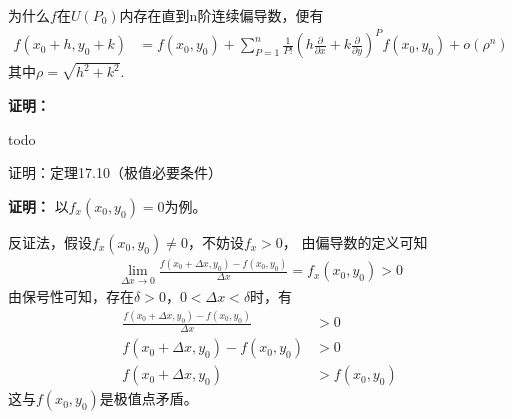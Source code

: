 \documentclass{article}
\begin{document}
\begin{zremark}
  为什么$f$在$U(P_0)$内存在直到n阶连续偏导数，便有
  \begin{align*}
    f(x_0 + h, y_0 + k)
     & = f(x_0, y_0) + \sum\limits_{P = 1}^n \frac{1}{P!}(h \frac{\partial}{\partial x} + k \frac{\partial}{\partial y})^P f(x_0, y_0) + o(\rho^n)
  \end{align*}
  其中$\rho = \sqrt{h^2 + k^2}$.
\end{zremark}
\textbf{证明：}

todo

\begin{zremark}
  证明：定理17.10（极值必要条件）
\end{zremark}
\textbf{证明：}
以$f_x(x_0, y_0) = 0$为例。

反证法，假设$f_x(x_0, y_0) \neq 0$，不妨设$f_x > 0$，
由偏导数的定义可知
\begin{align*}
  \lim\limits_{\Delta x \to 0} \frac{f(x_0 + \Delta x, y_0) - f(x_0, y_0)}{\Delta x}
  = f_x(x_0, y_0) > 0
\end{align*}
由保号性可知，存在$\delta > 0$，$0 < \Delta x < \delta$时，有
\begin{align*}
  \frac{f(x_0 + \Delta x, y_0) - f(x_0, y_0)}{\Delta x} & > 0           \\
  f(x_0 + \Delta x, y_0) - f(x_0, y_0)                  & > 0           \\
  f(x_0 + \Delta x, y_0)                                & > f(x_0, y_0)
\end{align*}
这与$f(x_0, y_0)$是极值点矛盾。
\end{document}
